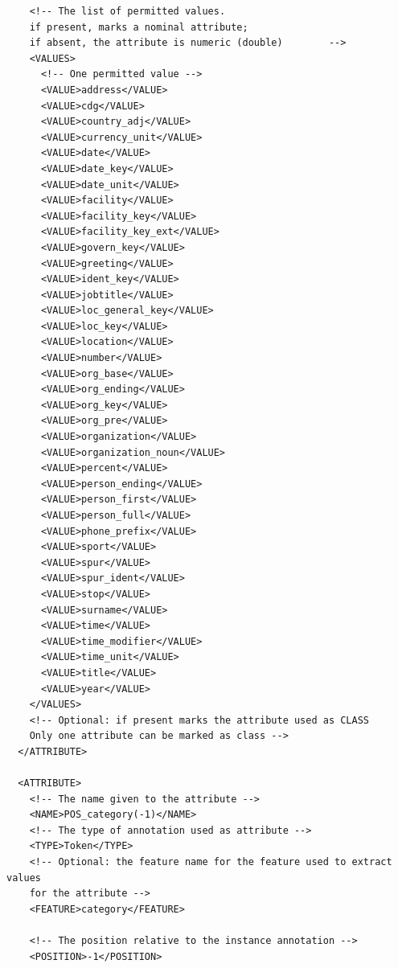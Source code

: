 \begin{verbatim}
    <!-- The list of permitted values.
    if present, marks a nominal attribute;
    if absent, the attribute is numeric (double)        -->
    <VALUES>
      <!-- One permitted value -->
      <VALUE>address</VALUE>
      <VALUE>cdg</VALUE>
      <VALUE>country_adj</VALUE>
      <VALUE>currency_unit</VALUE>
      <VALUE>date</VALUE>
      <VALUE>date_key</VALUE>
      <VALUE>date_unit</VALUE>
      <VALUE>facility</VALUE>
      <VALUE>facility_key</VALUE>
      <VALUE>facility_key_ext</VALUE>
      <VALUE>govern_key</VALUE>
      <VALUE>greeting</VALUE>
      <VALUE>ident_key</VALUE>
      <VALUE>jobtitle</VALUE>
      <VALUE>loc_general_key</VALUE>
      <VALUE>loc_key</VALUE>
      <VALUE>location</VALUE>
      <VALUE>number</VALUE>
      <VALUE>org_base</VALUE>
      <VALUE>org_ending</VALUE>
      <VALUE>org_key</VALUE>
      <VALUE>org_pre</VALUE>
      <VALUE>organization</VALUE>
      <VALUE>organization_noun</VALUE>
      <VALUE>percent</VALUE>  
      <VALUE>person_ending</VALUE>
      <VALUE>person_first</VALUE>
      <VALUE>person_full</VALUE>
      <VALUE>phone_prefix</VALUE>
      <VALUE>sport</VALUE>
      <VALUE>spur</VALUE>
      <VALUE>spur_ident</VALUE>
      <VALUE>stop</VALUE>
      <VALUE>surname</VALUE>
      <VALUE>time</VALUE>
      <VALUE>time_modifier</VALUE>
      <VALUE>time_unit</VALUE>
      <VALUE>title</VALUE>
      <VALUE>year</VALUE>
    </VALUES>
    <!-- Optional: if present marks the attribute used as CLASS
    Only one attribute can be marked as class -->
  </ATTRIBUTE>

  <ATTRIBUTE>
    <!-- The name given to the attribute -->
    <NAME>POS_category(-1)</NAME>
    <!-- The type of annotation used as attribute -->
    <TYPE>Token</TYPE>
    <!-- Optional: the feature name for the feature used to extract values
    for the attribute -->
    <FEATURE>category</FEATURE>

    <!-- The position relative to the instance annotation -->
    <POSITION>-1</POSITION>


\end{verbatim}
